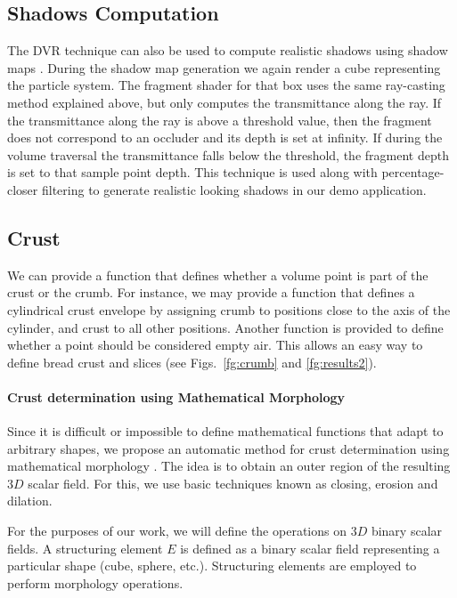 \subsection{Shadows Computation}

The DVR technique can also be used to compute realistic shadows using shadow maps \cite{Williams1978}.
During the shadow map generation we again render a cube representing the particle system.
The fragment shader for that box uses the same ray-casting method explained above, but only computes the transmittance along the ray. 
If the transmittance along the ray is above a threshold value, then the fragment does not correspond to an occluder and its depth is set at infinity. 
If during the volume traversal the transmittance falls below the threshold, the fragment depth is set to that sample point depth.
This technique is used along with percentage-closer filtering to generate realistic looking shadows in our demo application.

\subsection{Crust}
We can provide a function that defines whether a volume point is part of the crust or the crumb. For instance, we may provide a function that defines a cylindrical crust envelope by assigning crumb to positions close to the axis of the cylinder, and crust to all other positions. Another function is provided to define whether a point should be considered empty air.
This allows an easy way to define bread crust and slices (see Figs.~\ref{fg:crumb} and \ref{fg:results2}).

\paragraph{Crust determination using Mathematical Morphology}
Since it is difficult or impossible to define mathematical functions that adapt to arbitrary shapes, we propose an automatic method for crust determination using mathematical morphology \cite{Gonzalez2001}.
The idea is to obtain an outer region of the resulting $3D$ scalar field. 
For this, we use basic techniques known as closing, erosion and dilation.

For the purposes of our work, we will define the operations on $3D$ binary scalar fields.
A structuring element $E$ is defined as a binary scalar field representing a particular shape (cube, sphere, etc.).
Structuring elements are employed to perform morphology operations.


